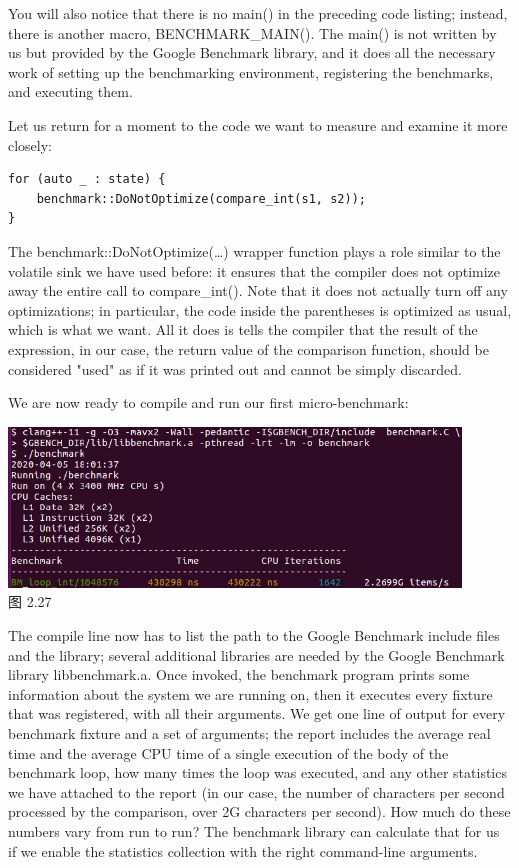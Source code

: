 You will also notice that there is no main() in the preceding code listing; instead, there is another macro, BENCHMARK\_MAIN(). The main() is not written by us but provided by the Google Benchmark library, and it does all the necessary work of setting up the benchmarking environment, registering the benchmarks, and executing them.

Let us return for a moment to the code we want to measure and examine it more closely:

\begin{lstlisting}[style=styleCXX]
for (auto _ : state) {
	benchmark::DoNotOptimize(compare_int(s1, s2));
}
\end{lstlisting}

The benchmark::DoNotOptimize(…) wrapper function plays a role similar to the volatile sink we have used before: it ensures that the compiler does not optimize away the entire call to compare\_int(). Note that it does not actually turn off any optimizations; in particular, the code inside the parentheses is optimized as usual, which is what we want. All it does is tells the compiler that the result of the expression, in our case, the return value of the comparison function, should be considered "used" as if it was printed out and cannot be simply discarded.

We are now ready to compile and run our first micro-benchmark:

\begin{center}
\includegraphics[width=0.9\textwidth]{content/1/chapter2/images/27.jpg}\\
图 2.27
\end{center}

The compile line now has to list the path to the Google Benchmark include files and the library; several additional libraries are needed by the Google Benchmark library libbenchmark.a. Once invoked, the benchmark program prints some information about the system we are running on, then it executes every fixture that was registered, with all their arguments. We get one line of output for every benchmark fixture and a set of arguments; the report includes the average real time and the average CPU time of a single execution of the body of the benchmark loop, how many times the loop was executed, and any other statistics we have attached to the report (in our case, the number of characters per second processed by the comparison, over 2G characters per second). How much do these numbers vary from run to run? The benchmark library can calculate that for us if we enable the statistics collection with the right command-line arguments.

